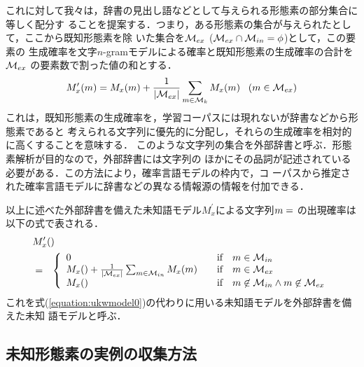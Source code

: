 これに対して我々は，辞書の見出し語などとして与えられる形態素の部分集合に等しく配分す
ることを提案する．つまり，ある形態素の集合が与えられたとして，ここから既知形態素を除
いた集合を${\cal M}_{ex}$ (${\cal M}_{ex}\cap{\cal M}_{in}=\phi$)として，この要素の
生成確率を文字$n$-gramモデルによる確率と既知形態素の生成確率の合計を${\cal M}_{ex}$
の要素数で割った値の和とする．
\begin{equation}
  \label{equation:ukwmodel4}
  M_{x}^{\prime}(m)
  = M_{x}(m)+\frac{1}{|{\cal M}_{ex}|}\sum_{m \in {\cal M}_{k}}M_{x}(m)
  \;\;\; (m \in {\cal M}_{ex})
\end{equation}
これは，既知形態素の生成確率を，学習コーパスには現れないが辞書などから形態素であると
考えられる文字列に優先的に分配し，それらの生成確率を相対的に高くすることを意味する．
このような文字列の集合を外部辞書と呼ぶ．形態素解析が目的なので，外部辞書には文字列の
ほかにその品詞が記述されている必要がある．この方法により，確率言語モデルの枠内で，コ
ーパスから推定された確率言語モデルに辞書などの異なる情報源の情報を付加できる．

以上に述べた外部辞書を備えた未知語モデル$M_{x}^{\prime}$による文字列$m =\Conc{x}{h}$
の出現確率は以下の式で表される．
\begin{eqnarray*}
  \lefteqn{M_{x}^{\prime}(\Conc{x}{h})} \\
  & = & \left\{\begin{array}{lccl}
        0 
          & & \mbox{if} & m \in {\cal M}_{in} \\
        M_{x}(\Conc{x}{h})+\frac{1}{|{\cal M}_{ex}|}\sum_{m \in {\cal M}_{in}}M_{x}(m)
          & & \mbox{if} & m \in {\cal M}_{ex} \\
        M_{x}(\Conc{x}{h})
          & & \mbox{if} & m \not\in {\cal M}_{in} \wedge m \not\in {\cal M}_{ex} \\
        \end{array}\right.
\end{eqnarray*}
これを式(\ref{equation:ukwmodel0})の代わりに用いる未知語モデルを外部辞書を備えた未知
語モデルと呼ぶ．



\subsection{未知形態素の実例の収集方法}


